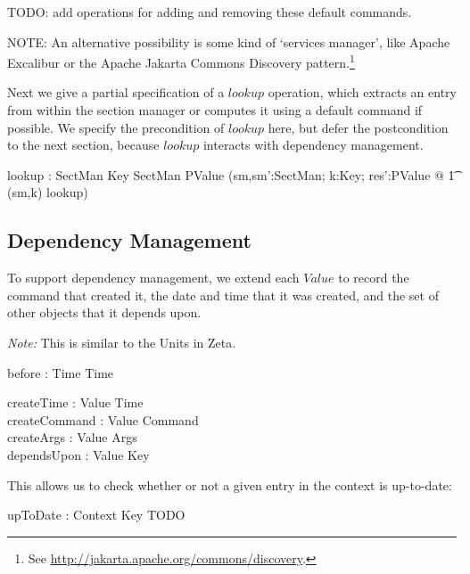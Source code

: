 \documentclass{llncs} %
\begin{document}
TODO: add operations for adding and removing these default commands. 

NOTE: An alternative possibility is some kind of `services manager', like
  Apache Excalibur or the Apache Jakarta Commons Discovery 
  pattern.\footnote{See \url{http://jakarta.apache.org/commons/discovery}.}


Next we give a partial specification of a $lookup$ operation, which
extracts an entry from within the section manager or computes it
using a default command if possible.  We specify the precondition
of $lookup$ here, but defer the postcondition to the next section, because
$lookup$ interacts with dependency management. 

\begin{axdef}
  lookup : SectMan \cross Key \rel SectMan \cross PValue
\where
  (\forall sm,sm':SectMan; k:Key; res':PValue @
  \t1  (sm,k) \in \dom lookup) \\
\end{axdef}


\subsection{Dependency Management} \label{sec:dependency}

To support dependency management, we extend each $Value$ 
to record the command that created it, the date and time that it was 
created, and the set of other objects that it depends upon.

\emph{Note:} This is similar to the Units in Zeta.

\begin{zed}
  [Time]
\end{zed}

\begin{axdef}
  before : Time \rel Time
\end{axdef} 

\begin{axdef}
  createTime : Value \fun Time \\
  createCommand  : Value \fun Command \\
  createArgs  : Value \fun Args \\
  dependsUpon : Value \fun \finset Key
\end{axdef}

This allows us to check whether or not a given entry
in the context is up-to-date:

\begin{axdef}
  upToDate : Context \rel Key
\where
  TODO
\end{axdef} 
\end{document}
